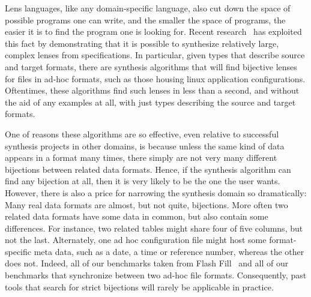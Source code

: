 \documentclass[acmsmall,screen,anonymous]{acmart}
\begin{document}
Lens languages, like any domain-specific language, also cut down the space of
possible programs one can write, and the smaller the space of programs,
the easier it is to find the program one is looking for.  
Recent research~\cite{optician, maina+:quotient-synthesis} has exploited this fact by demonstrating that it
is possible to synthesize relatively large, complex lenses from specifications.
In particular, given types that describe source and target formats, there are
synthesis algorithms that will find bijective
lenses
for files 
in ad-hoc formats, such as those housing linux application configurations.
Oftentimes, these algorithms find such lenses in less than a second, and without
the aid of any examples at all, with just types describing the source and target
formats. 

One of reasons these algorithms are so effective, even relative to successful
synthesis projects in other domains, is because unless the same kind of data
appears in a format many times, there simply are not very many different
bijections between related data formats. Hence, if the synthesis algorithm can
find any bijection at all, then it is very likely to be the one the user wants.
However, there is also a price for narrowing the synthesis domain so
dramatically: Many real data formats are almost, but not quite, bijections. More
often two related data formats have some data in common, but also contain some
differences. For instance, two related tables might share four of five columns,
but not the last. Alternately, one ad hoc configuration file might host some
format-specific meta data, such as a date, a time or reference number, whereas
the other does not. Indeed, all of our benchmarks taken from Flash
Fill~\cite{flashfill} and all of our benchmarks that synchronize between two
ad-hoc file formats. Consequently, past tools that search for strict bijections
will rarely be applicable in practice.
\end{document}
